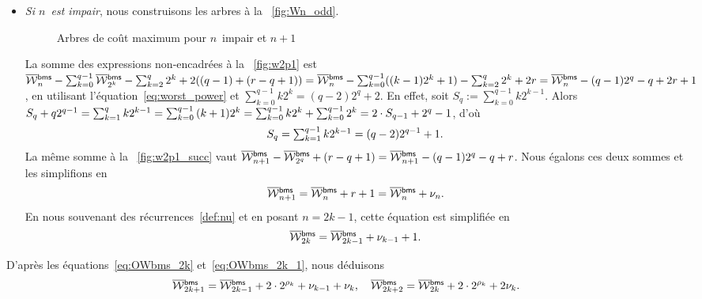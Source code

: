 \begin{itemize}
  \item \emph{Si \(n\)~est impair}, nous construisons les arbres à la
    \fig~\vref{fig:Wn_odd}.
\begin{figure}[t]
\centering
{}
\qquad
{}
\caption{Arbres de coût maximum pour \(n\)~impair et \(n+1\)}
\label{fig:Wn_odd}
\end{figure}
La somme des expressions non-encadrées à la \fig~\ref{fig:w2p1} est
\(\OW{\fun{bms}}{n} - \sum_{k=0}^{q-1}\OW{\fun{bms}}{2^k} -
\sum_{k=2}^{q}2^k + 2((q-1)+(r-q+1)) = \OW{\fun{bms}}{n} -
\sum_{k=0}^{q-1}((k-1)2^{k}+1) - \sum_{k=2}^{q}2^k + 2r =
\OW{\fun{bms}}{n} - (q-1)2^q - q + 2r + 1\), en utilisant
l'équation~\eqref{eq:worst_power} et \(\sum_{k=0}^{q-1}k2^k =
(q-2)2^{q}+2\). En effet, soit \(S_{q} :=
\sum_{k=0}^{q-1}{k2^{k-1}}\). Alors \(S_{q} + q2^{q-1} =
\smash[t]{\sum_{k=1}^{q}{k2^{k-1}}} =
\smash[t]{\sum_{k=0}^{q-1}{(k+1)2^{k}}} =
\smash[t]{\sum_{k=0}^{q-1}{k2^{k}}} +
\smash[t]{\sum_{k=0}^{q-1}{2^{k}}} = 2 \cdot S_{q-1} + 2^{q} - 1\),
d'où
     \begin{equation}
       \abovedisplayskip=4pt
       \belowdisplayskip=4pt
       S_{q} = \smash[t]{\textstyle\sum_{k=1}^{q-1}{k2^{k-1}}} = (q-2)2^{q-1} + 1.\label{eq:Sj}
     \end{equation}
     La même somme à la \fig~\ref{fig:w2p1_succ}
     vaut \(\OW{\fun{bms}}{n+1} - \OW{\fun{bms}}{2^q} + (r-q+1) =
     \OW{\fun{bms}}{n+1} - (q-1)2^{q} - q + r\). Nous égalons ces deux
     sommes et les simplifions en
     \begin{equation*}
       \OW{\fun{bms}}{n+1} = \OW{\fun{bms}}{n} + r + 1=
       \OW{\fun{bms}}{n} + \nu_n.
     \end{equation*}
     En nous souvenant des récurrences~\eqref{def:nu}  et
     en posant \(n=2k-1\), cette équation est simplifiée en
     \begin{equation}
       \OW{\fun{bms}}{2k} = \OW{\fun{bms}}{2k-1} + \nu_{k-1} + 1.
       \label{eq:OWbms_2k}
     \end{equation}

\end{itemize}
D'après les équations~\eqref{eq:OWbms_2k} et~\eqref{eq:OWbms_2k_1},
nous déduisons
\begin{equation*}
\OW{\fun{bms}}{2k+1} = \OW{\fun{bms}}{2k-1} + 2 \cdot 2^{\rho_k} +
\nu_{k-1} + \nu_k,\quad \OW{\fun{bms}}{2k+2} = \OW{\fun{bms}}{2k} + 2
\cdot 2^{\rho_k} + 2\nu_k.
\end{equation*}
